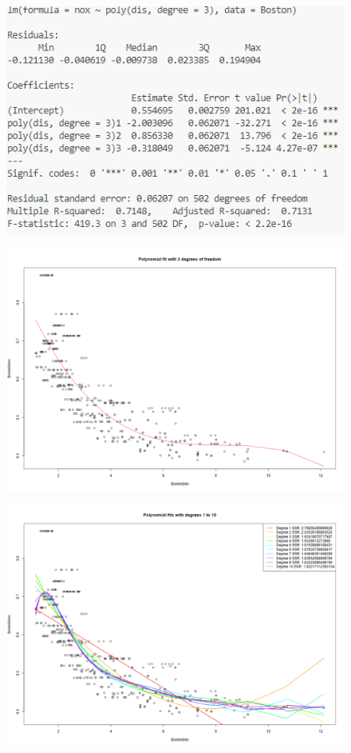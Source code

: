 \documentclass{article}
\begin{document}
\begin{figure}[h]
    \includegraphics[width=1\textwidth]{figs/q9-11.png}
    \caption{}
    \label{fig: q9-11}
\end{figure}
\begin{figure}[h]
    \includegraphics[width=1\textwidth]{figs/q9-12.png}
    \caption{}
    \label{fig: q9-12}
\end{figure}
\begin{figure}[h]
    \includegraphics[width=1\textwidth]{figs/q9-13.png}
    \caption{}
    \label{fig: q9}
\end{figure}
\end{document}
